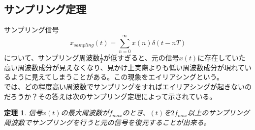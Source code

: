 \documentclass[a4paper]{jsarticle}
\newtheorem{theorem}{定理}[section]
\begin{document}
\subsection{サンプリング定理}
サンプリング信号
\begin{equation}
x_{sampling} \left( t \right) = \sum_{n=0}^{ \infty } x \left( n\right) \delta \left( t-nT \right)
\end{equation}
について、サンプリング周波数$ \frac { 1 } { T } $が低すぎると、元の信号$ x \left( t \right ) $に存在していた高い周波数成分が見えなくなり、見かけ上実際よりも低い周波数成分が現れているように見えてしまうことがある。この現象をエイリアシングという。\\
では、どの程度高い周波数でサンプリングをすればエイリアシングが起きないのだろうか？その答えは次のサンプリング定理によって示されている。
\begin{theorem}
信号$ x \left( t \right) $の最大周波数が$ f_{max} $のとき、$ \left( t \right) $を$ 2 f_{max} $以上のサンプリング周波数でサンプリングを行うと元の信号を復元することが出来る。
\end{theorem}
\end{document}
